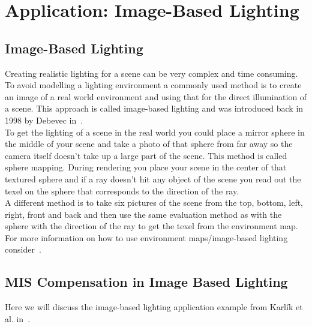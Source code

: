 \chapter{Application: Image-Based Lighting}
\label{ch:application_ibl}


\section{Image-Based Lighting}
\label{sec:ibl}
Creating realistic lighting for a scene can be very complex and time consuming.
To avoid modelling a lighting environment a commonly used method is to create an image of a real world environment
and using that for the direct illumination of a scene.
This approach is called image-based lighting and was introduced back in 1998 by Debevec in~\cite{debevec}.\\
To get the lighting of a scene in the real world you could place a mirror sphere in the middle of your scene
and take a photo of that sphere from far away
so the camera itself doesn't take up a large part of the scene.
This method is called sphere mapping.
During rendering you place your scene in the center of that textured sphere
and if a ray doesn't hit any object of the scene you read out the texel
on the sphere that corresponds to the direction of the ray.\\
A different method is to take six pictures of the scene from the top, bottom, left, right, front and back
and then use the same evaluation method as with the sphere with the direction of the ray
to get the texel from the environment map.
For more information on how to use environment maps/image-based lighting consider~\cite{environment_map}.


\section{MIS Compensation in Image Based Lighting}
\label{sec:misc_ibl}
Here we will discuss the image-based lighting application example from Karl\'ik et al. in~\cite[Section~6-7]{Karlik2019}.


